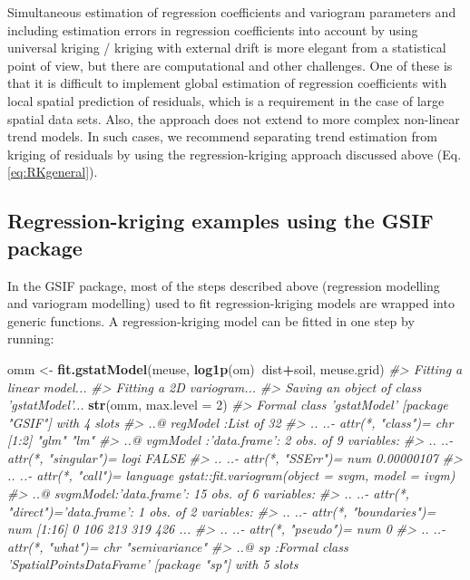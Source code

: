 \documentclass[graybox,natbib,nospthms,UStrade]{svmono}
\newenvironment{Shaded}{\begin{snugshade}}{\end{snugshade}}
\newcommand{\CommentTok}[1]{\textcolor[rgb]{0.37,0.37,0.37}{\textit{#1}}}
\newcommand{\DataTypeTok}[1]{\textcolor[rgb]{0.27,0.27,0.27}{#1}}
\newcommand{\DecValTok}[1]{\textcolor[rgb]{0.06,0.06,0.06}{#1}}
\newcommand{\KeywordTok}[1]{\textcolor[rgb]{0.27,0.27,0.27}{\textbf{#1}}}
\newcommand{\NormalTok}[1]{#1}
\newcommand{\OperatorTok}[1]{\textcolor[rgb]{0.43,0.43,0.43}{\textbf{#1}}}
\newcommand{\StringTok}[1]{\textcolor[rgb]{0.5,0.5,0.5}{#1}}
\begin{document}
Simultaneous estimation of regression coefficients and variogram
parameters and including estimation errors in regression coefficients
into account by using universal kriging / kriging with external drift is
more elegant from a statistical point of view, but there are
computational and other challenges. One of these is that it is difficult
to implement global estimation of regression coefficients with local
spatial prediction of residuals, which is a requirement in the case of
large spatial data sets. Also, the approach does not extend to more
complex non-linear trend models. In such cases, we recommend separating
trend estimation from kriging of residuals by using the
regression-kriging approach discussed above (Eq.\eqref{eq:RKgeneral}).

\hypertarget{regression-kriging-examples-using-the-gsif-package}{%
\subsection{Regression-kriging examples using the GSIF package}\label{regression-kriging-examples-using-the-gsif-package}}

In the GSIF package, most of the steps described above (regression modelling
and variogram modelling) used to fit regression-kriging models are
wrapped into generic functions. A regression-kriging model can be fitted
in one step by running:

\begin{Shaded}
\begin{Highlighting}[]
\NormalTok{omm <-}\StringTok{ }\KeywordTok{fit.gstatModel}\NormalTok{(meuse, }\KeywordTok{log1p}\NormalTok{(om)}\OperatorTok{~}\NormalTok{dist}\OperatorTok{+}\NormalTok{soil, meuse.grid)}
\CommentTok{#> Fitting a linear model...}
\CommentTok{#> Fitting a 2D variogram...}
\CommentTok{#> Saving an object of class 'gstatModel'...}
\KeywordTok{str}\NormalTok{(omm, }\DataTypeTok{max.level =} \DecValTok{2}\NormalTok{)}
\CommentTok{#> Formal class 'gstatModel' [package "GSIF"] with 4 slots}
\CommentTok{#>   ..@ regModel :List of 32}
\CommentTok{#>   .. ..- attr(*, "class")= chr [1:2] "glm" "lm"}
\CommentTok{#>   ..@ vgmModel :'data.frame':    2 obs. of  9 variables:}
\CommentTok{#>   .. ..- attr(*, "singular")= logi FALSE}
\CommentTok{#>   .. ..- attr(*, "SSErr")= num 0.00000107}
\CommentTok{#>   .. ..- attr(*, "call")= language gstat::fit.variogram(object = svgm, model = ivgm)}
\CommentTok{#>   ..@ svgmModel:'data.frame':    15 obs. of  6 variables:}
\CommentTok{#>   .. ..- attr(*, "direct")='data.frame': 1 obs. of  2 variables:}
\CommentTok{#>   .. ..- attr(*, "boundaries")= num [1:16] 0 106 213 319 426 ...}
\CommentTok{#>   .. ..- attr(*, "pseudo")= num 0}
\CommentTok{#>   .. ..- attr(*, "what")= chr "semivariance"}
\CommentTok{#>   ..@ sp       :Formal class 'SpatialPointsDataFrame' [package "sp"] with 5 slots}
\end{Highlighting}
\end{Shaded}
\end{document}
